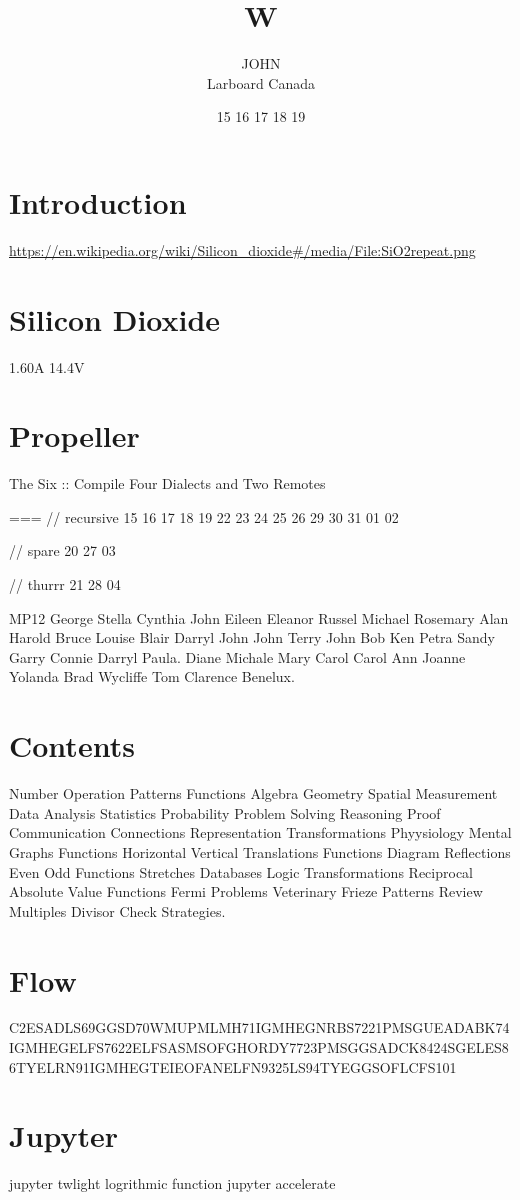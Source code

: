 \documentclass{article}
\title{W}
\author{
  \parbox{0.3\linewidth}{\centering JOHN\\Larboard Canada}
  }
\date{15 16 17 18 19}
\begin{document}
\maketitle

\section{Introduction}
\url{https://en.wikipedia.org/wiki/Silicon_dioxide#/media/File:SiO2repeat.png}

\section{Silicon Dioxide}
1.60A 14.4V

\section{Propeller}
The Six :: Compile Four Dialects and Two Remotes

                                                        ===
// recursive
15 16 17 18 19
22 23 24 25 26
29 30 31 01 02

// spare
20
27
03

// thurrr
21
28
04

MP12
George Stella Cynthia John Eileen Eleanor Russel Michael Rosemary Alan Harold Bruce Louise Blair Darryl John John Terry John Bob Ken Petra Sandy Garry Connie Darryl Paula. Diane Michale Mary Carol Carol Ann Joanne Yolanda Brad Wycliffe Tom Clarence Benelux.

\section{Contents}

Number Operation Patterns Functions Algebra Geometry Spatial Measurement Data Analysis Statistics Probability Problem Solving Reasoning Proof Communication Connections Representation Transformations Phyysiology Mental Graphs Functions Horizontal Vertical Translations Functions Diagram Reflections Even Odd Functions Stretches Databases Logic Transformations Reciprocal Absolute Value Functions Fermi Problems Veterinary Frieze Patterns Review Multiples Divisor Check Strategies.

\section{Flow}
C2ESADLS69GGSD70WMUPMLMH71IGMHEGNRBS7221PMSGUEADABK74IGMHEGELFS7622ELFSASMSOFGHORDY7723PMSGGSADCK8424SGELES86TYELRN91IGMHEGTEIEOFANELFN9325LS94TYEGGSOFLCFS101

\section{Jupyter}
jupyter twlight logrithmic function
jupyter accelerate



\end{document}
